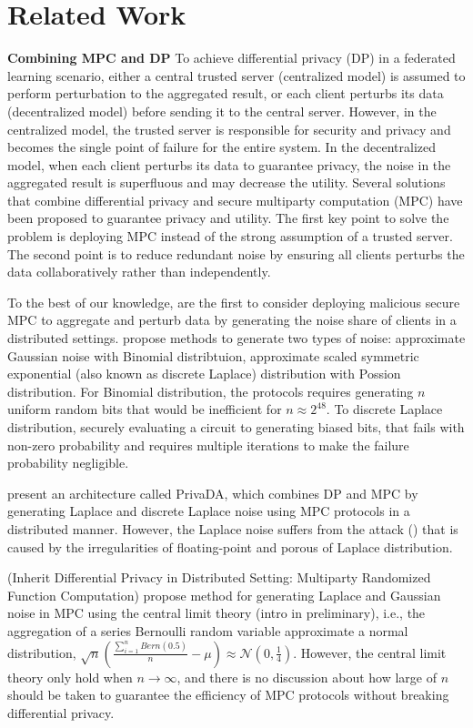 \chapter{Related Work}
\label{cha:RelatedWork}

\textbf{Combining MPC and DP}
To achieve differential privacy (DP) in a federated learning scenario, either a central trusted server (centralized model) is assumed to perform perturbation to the aggregated result, or each client perturbs its data (decentralized model) before sending it to the central server. However, in the centralized model, the trusted server is responsible for security and privacy and becomes the single point of failure for the entire system. In the decentralized model, when each client perturbs its data to guarantee privacy, the noise in the aggregated result is superﬂuous and may decrease the utility. 
Several solutions that combine differential privacy and secure multiparty computation (MPC) have been proposed to guarantee privacy and utility. The first key point to solve the problem is deploying MPC instead of the strong assumption of a trusted server. The second point is to reduce redundant noise by ensuring all clients perturbs the data collaboratively rather than independently. 


To the best of our knowledge, \cite{dwork2006our} are the first to consider deploying malicious secure MPC to aggregate and perturb data by generating the noise share of clients in a distributed settings. \cite{dwork2006our} propose methods to generate two types of noise: approximate Gaussian noise with Binomial distribtuion, approximate scaled symmetric exponential (also known as discrete Laplace) distribution with Possion distribution. For Binomial distribution, the protocols requires generating $n$ uniform random bits that would be inefficient for $n\approx 2^{48}$. To discrete Laplace distribution, \cite{dwork2006our} securely evaluating a circuit to generating biased bits, that fails with non-zero probability and requires multiple iterations to make the failure probability negligible. 

\cite{eigner2014differentially} present an architecture called PrivaDA, which combines DP and MPC by generating Laplace and discrete Laplace noise using MPC protocols in a distributed manner. However, the Laplace noise suffers from the attack (\cite{mironov2012significance}) that is caused by the irregularities of floating-point and porous of Laplace distribution. 

(Inherit Differential Privacy in Distributed Setting: Multiparty Randomized Function Computation) propose method for generating Laplace and Gaussian noise in MPC using the central limit theory (intro in preliminary), i.e., the aggregation of a series Bernoulli random variable approximate a normal distribution, $\sqrt{n}\left(\frac{\sum_{i = 1}^{n}  Bern\left(0.5\right) }{n}-\mu\right) \approx \mathcal{N} \left(0,\frac{1}{4}\right)   $. However, the central limit theory only hold when $n \to \infty $, and there is no discussion about how large of $n$ should be taken to guarantee the efficiency of MPC protocols without breaking differential privacy. 

